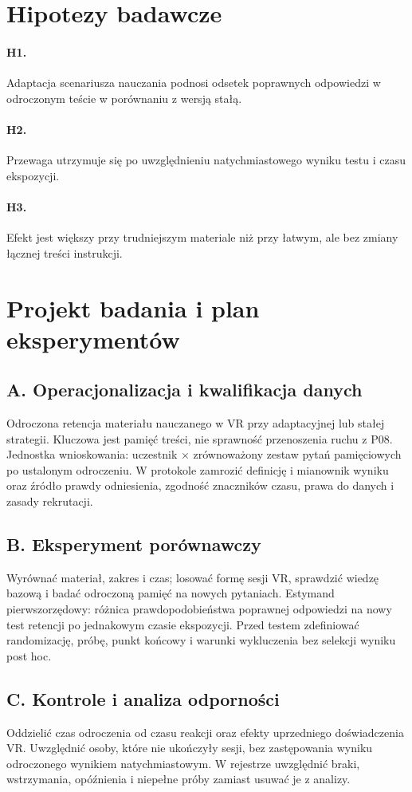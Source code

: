\documentclass[11pt,a4paper]{article}
\begin{document}
\section{Hipotezy badawcze}
\paragraph{H1.} Adaptacja scenariusza nauczania podnosi odsetek poprawnych odpowiedzi w odroczonym teście w porównaniu z wersją stałą.
\paragraph{H2.} Przewaga utrzymuje się po uwzględnieniu natychmiastowego wyniku testu i czasu ekspozycji.
\paragraph{H3.} Efekt jest większy przy trudniejszym materiale niż przy łatwym, ale bez zmiany łącznej treści instrukcji.
\section{Projekt badania i plan eksperymentów}
\subsection{A. Operacjonalizacja i kwalifikacja danych}
Odroczona retencja materiału nauczanego w VR przy adaptacyjnej lub stałej strategii. Kluczowa jest pamięć treści, nie sprawność przenoszenia ruchu z P08. Jednostka wnioskowania: uczestnik × zrównoważony zestaw pytań pamięciowych po ustalonym odroczeniu. W protokole zamrozić definicję i mianownik wyniku oraz źródło prawdy odniesienia, zgodność znaczników czasu, prawa do danych i zasady rekrutacji.
\subsection{B. Eksperyment porównawczy}
Wyrównać materiał, zakres i czas; losować formę sesji VR, sprawdzić wiedzę bazową i badać odroczoną pamięć na nowych pytaniach. Estymand pierwszorzędowy: różnica prawdopodobieństwa poprawnej odpowiedzi na nowy test retencji po jednakowym czasie ekspozycji. Przed testem zdefiniować randomizację, próbę, punkt końcowy i warunki wykluczenia bez selekcji wyniku post hoc.
\subsection{C. Kontrole i analiza odporności}
Oddzielić czas odroczenia od czasu reakcji oraz efekty uprzedniego doświadczenia VR. Uwzględnić osoby, które nie ukończyły sesji, bez zastępowania wyniku odroczonego wynikiem natychmiastowym. W rejestrze uwzględnić braki, wstrzymania, opóźnienia i niepełne próby zamiast usuwać je z analizy.
\end{document}
